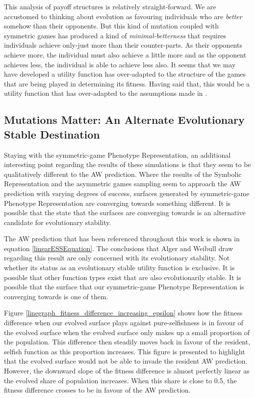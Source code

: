 \documentclass[11pt]{book}
\newcommand*{\np}{\par\noindent\newline}
\begin{document}
\np This analysis of payoff structures is relatively straight-forward.
We are accustomed to thinking about evolution as favouring individuals who are \textit{better} somehow than their opponents. 
But this kind of mutation coupled with symmetric games has produced a kind of \textit{minimal-betterness} that requires individuals achieve only-just more than their counter-parts.
As their opponents achieve more, the individual must also achieve a little more and as the opponent achieves less, the individual is able to achieve less also.
It seems that we may have developed a utility function has over-adapted to the structure of the games that are being played in determining its fitness.
Having said that, this would be a utility function that has over-adapted to the assumptions made in \citet{alger_generalization_2012}.

\subsection[Mutations Matter]{Mutations Matter: An Alternate Evolutionary Stable Destination}
Staying with the symmetric-game Phenotype Representation, an additional interesting point regarding the results of these simulations is that they seem to be qualitatively different to the AW prediction.
Where the results of the Symbolic Representation and the asymmetric games sampling seem to approach the AW prediction with varying degrees of success, surfaces generated by symmetric-game Phenotype Representation are converging towards something different.
It is possible that the state that the surfaces are converging towards is an alternative candidate for evolutionary stability.

\np The AW prediction that has been referenced throughout this work is shown in equation \ref{linearESSEquation}.
The conclusions that Alger and Weibull draw regarding this result are only concerned with its evolutionary stability.
Not whether its status as an evolutionary stable utility function is exclusive.
It is possible that other function types exist that are also evolutionarily stable.
It is possible that the surface that our symmetric-game Phenotype Representation is converging towards is one of them.

\np Figure \ref{linegraph_fitness_difference_increasing_epsilon} 
shows how the fitness difference when our evolved surface plays against pure-selfishness is in favour of the evolved surface when the evolved surface only makes up a small proportion of the population.
This difference then steadily moves back in favour of the resident, selfish function as this proportion increases.
This figure is presented to highlight that the evolved surface would not be able to invade the resident AW prediction.
However, the downward slope of the fitness difference is almost perfectly linear as the evolved share of population increases.
When this share is close to 0.5, the fitness difference crosses to be in favour of the AW prediction.
\end{document}
